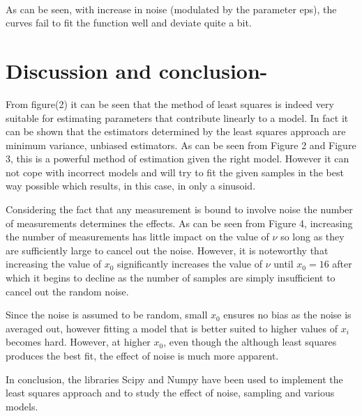 \documentclass[11pt]{article}
\begin{document}
    \begin{center}
    \end{center}
    { \hspace*{\fill} \\}
    
    As can be seen, with increase in noise (modulated by the parameter eps),
the curves fail to fit the function well and deviate quite a bit.

    \section{Discussion and conclusion-}\label{discussion-and-conclusion-}

From figure(2) it can be seen that the method of least squares is indeed
very suitable for estimating parameters that contribute linearly to a
model. In fact it can be shown that the estimators determined by the
least squares approach are minimum variance, unbiased estimators. As can
be seen from Figure 2 and Figure 3, this is a powerful method of
estimation given the right model. However it can not cope with incorrect
models and will try to fit the given samples in the best way possible
which results, in this case, in only a sinusoid.

Considering the fact that any measurement is bound to involve noise the
number of measurements determines the effects. As can be seen from
Figure 4, increasing the number of measurements has little impact on the
value of $\nu$ so long as they are sufficiently large to cancel out the
noise. However, it is noteworthy that increasing the value of $x_0$
significantly increases the value of $\nu$ until $x_0 = 16$ after which
it begins to decline as the number of samples are simply insufficient to
cancel out the random noise.

Since the noise is assumed to be random, small $x_0$ ensures no bias as
the noise is averaged out, however fitting a model that is better suited
to higher values of $x_i$ becomes hard. However, at higher $x_0$, even
though the although least squares produces the best fit, the effect of
noise is much more apparent.

In conclusion, the libraries Scipy and Numpy have been used to implement
the least squares approach and to study the effect of noise, sampling
and various models.


    
    
    
    
\end{document}
